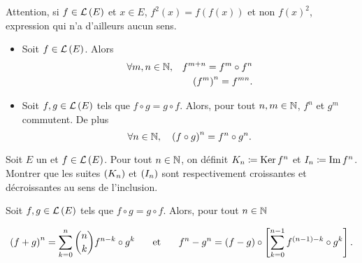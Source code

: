 \documentclass{magnolia}
\begin{document}
\begin{remarqueUnique}
\remarque Attention, si $f\in\mathcal{L}\left(E\right)$ et $x\in E$, $f^2(x)=f(f(x))$ et non $f(x)^2$, expression qui n'a
  d'ailleurs aucun sens.
\end{remarqueUnique}

\begin{proposition}
\begin{itemize}
\item Soit $f\in\mathcal{L}\left(E\right)$. Alors
\begin{eqnarray*}
\forall m,n\in\mathbb{N}, & & f^{m+n}=f^m\circ f^n\\
                 & & \left(f^m\right)^n=f^{mn}.
\end{eqnarray*}
\item Soit $f,g\in \mathcal{L}\left(E\right)$ tels que $f\circ g=g\circ f$. Alors, pour tout $n,m\in\mathbb{N}$, $f^n$ et $g^m$ commutent. De plus
\[\forall n\in\mathbb{N} ,\quad \left(f\circ g\right)^n=f^n \circ g^n.\]
\end{itemize}
\end{proposition}

\begin{exoUnique}
  \exo Soit $E$ un \Kev et $f\in\mathcal{L}\left(E\right)$. Pour tout $n\in\mathbb{N}$, on définit
    $K_n\coloneqq\mathop{\rm Ker} f^n$ et $I_n\coloneqq\operatorname{Im} f^n$. Montrer que les suites $\left(K_n\right)$ et
    $\left(I_n\right)$ sont respectivement croissantes et décroissantes au sens de
    l'inclusion.
  \end{exoUnique}

\begin{proposition}
  Soit $f,g\in\mathcal{L}\left(E\right)$ tels que $f\circ g=g\circ f$.
  Alors, pour tout $n\in\mathbb{N}$

    \[\left(f+g\right)^n = \sum_{k=0}^n \binom{n}{k} f^{n-k} \circ g^k \quad\quad\!\text{et}\quad\!\quad
      f^n-g^n=\left(f-g\right)\circ\left[\sum_{k=0}^{n-1} f^{\left(n-1\right)-k}\circ g^k\right].\]
  \end{proposition}







\end{document}
